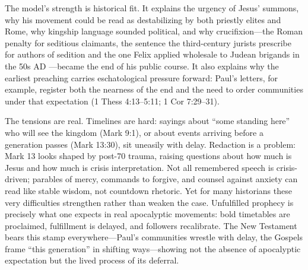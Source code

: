 The model’s strength is historical fit.
It explains the urgency of Jesus’ summons, why his movement could be read as destabilizing by both priestly elites and Rome, why kingship language sounded political, and why crucifixion---the Roman penalty for seditious claimants, the sentence the third-century jurists prescribe for authors of sedition \cite[5.22.1]{paulus:sententiae} and the one Felix applied wholesale to Judean brigands in the 50s AD \cite[2.253]{josephus:war}---became the end of his public course.
It also explains why the earliest preaching carries eschatological pressure forward: Paul’s letters, for example, register both the nearness of the end and the need to order communities under that expectation (1 Thess 4:13--5:11; 1 Cor 7:29--31).

The tensions are real.
Timelines are hard: sayings about “some standing here” who will see the kingdom (Mark 9:1), or about events arriving before a generation passes (Mark 13:30), sit uneasily with delay.
Redaction is a problem: Mark 13 looks shaped by post-70 trauma, raising questions about how much is Jesus and how much is crisis interpretation.
Not all remembered speech is crisis-driven; parables of mercy, commands to forgive, and counsel against anxiety can read like stable wisdom, not countdown rhetoric.
Yet for many historians these very difficulties strengthen rather than weaken the case.
Unfulfilled prophecy is precisely what one expects in real apocalyptic movements: bold timetables are proclaimed, fulfillment is delayed, and followers recalibrate.
The New Testament bears this stamp everywhere---Paul’s communities wrestle with delay, the Gospels frame “this generation” in shifting ways---showing not the absence of apocalyptic expectation but the lived process of its deferral.

